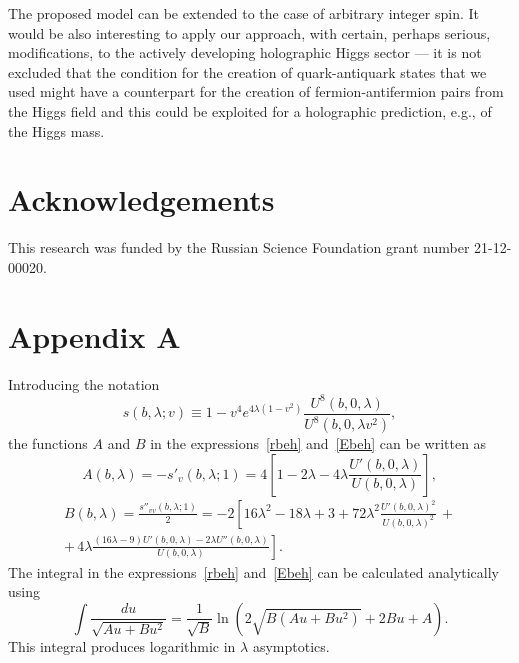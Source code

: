 \documentclass[a4paper,11pt]{article}
\newcommand{\lb}[0]{\left(}
\newcommand{\rb}[0]{\right)}
\newcommand{\lsb}{\left[}
\newcommand{\rsb}{\right]}
\begin{document}
The proposed model can be extended to the case of arbitrary integer spin.
It would be also interesting to apply our approach,
with certain, perhaps serious, modifications, to the actively developing holographic Higgs sector ---
it is not excluded that the condition for the creation of quark-antiquark states that we used might have
a counterpart for the creation of fermion-antifermion pairs from the Higgs field and this could be exploited
for a holographic prediction, e.g., of the Higgs mass.




\section*{Acknowledgements}
This research was funded by the Russian Science Foundation grant
number 21-12-00020.


\section*{Appendix A}

Introducing the notation
\begin{equation}\label{s_func}
  s(b,\lambda;v)\equiv 1-v^4e^{4\lambda(1-v^2)}\frac{U^8(b,0,\lambda)}{U^8(b,0,\lambda v^2)},
\end{equation}
the functions \(A\) and \(B\) in the expressions~\eqref{rbeh} and~\eqref{Ebeh} can be written as
\begin{equation}
  A(b,\lambda) = -s'_v(b,\lambda;1)=
  4\lsb 1-2\lambda-4\lambda\frac{U'(b,0,\lambda)}{U(b,0,\lambda)}\rsb,
\end{equation}
\begin{multline}
  B(b,\lambda) = \frac{s''_{vv}(b,\lambda;1)}{2}=-2\lsb 16\lambda^2-18\lambda+3+
  72\lambda^2\frac{U'(b,0,\lambda)^2}{U(b,0,\lambda)^2}\,+\right.\\\left.+\,
  4\lambda\frac{(16\lambda-9) U'(b,0,\lambda)-2 \lambda U''(b,0,\lambda)}{U(b,0,\lambda)}\rsb.
\end{multline}
The integral in the expressions~\eqref{rbeh} and~\eqref{Ebeh} can be calculated analytically using~\cite{GradRyzh}
\begin{equation}
  \int\frac{du}{\sqrt{Au+Bu^2}}=\frac{1}{\sqrt{B}}\ln\lb2\sqrt{B(Au+Bu^2)}+2Bu+A\rb.
\end{equation}
This integral produces logarithmic in \(\lambda\) asymptotics.
\end{document}
